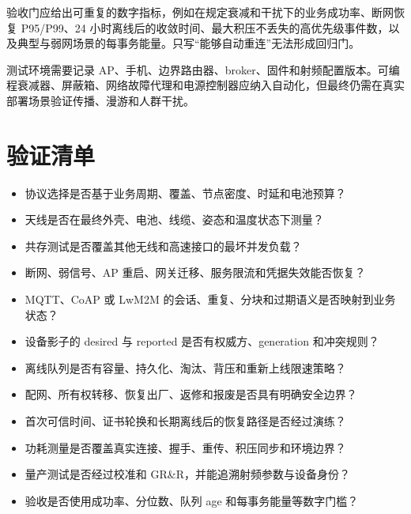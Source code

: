 验收门应给出可重复的数字指标，例如在规定衰减和干扰下的业务成功率、断网恢复 P95/P99、24 小时离线后的收敛时间、最大积压不丢失的高优先级事件数，以及典型与弱网场景的每事务能量。只写“能够自动重连”无法形成回归门。

测试环境需要记录 AP、手机、边界路由器、broker、固件和射频配置版本。可编程衰减器、屏蔽箱、网络故障代理和电源控制器应纳入自动化，但最终仍需在真实部署场景验证传播、漫游和人群干扰。

\section{验证清单}

\begin{itemize}
  \item 协议选择是否基于业务周期、覆盖、节点密度、时延和电池预算？
  \item 天线是否在最终外壳、电池、线缆、姿态和温度状态下测量？
  \item 共存测试是否覆盖其他无线和高速接口的最坏并发负载？
  \item 断网、弱信号、AP 重启、网关迁移、服务限流和凭据失效能否恢复？
  \item MQTT、CoAP 或 LwM2M 的会话、重复、分块和过期语义是否映射到业务状态？
  \item 设备影子的 desired 与 reported 是否有权威方、generation 和冲突规则？
  \item 离线队列是否有容量、持久化、淘汰、背压和重新上线限速策略？
  \item 配网、所有权转移、恢复出厂、返修和报废是否具有明确安全边界？
  \item 首次可信时间、证书轮换和长期离线后的恢复路径是否经过演练？
  \item 功耗测量是否覆盖真实连接、握手、重传、积压同步和环境边界？
  \item 量产测试是否经过校准和 GR\&R，并能追溯射频参数与设备身份？
  \item 验收是否使用成功率、分位数、队列 age 和每事务能量等数字门槛？
\end{itemize}

